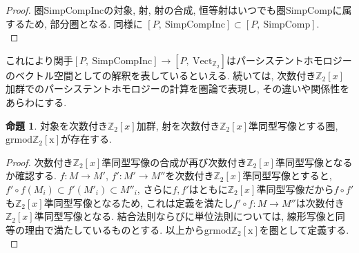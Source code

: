 \documentclass[a4paper]{jsarticle}
\theoremstyle{definition}
\newtheorem{prop}[dfn]{命題}
\newcommand{\SimpComp}{{\mathrm{SimpComp}}}
\newcommand{\Fun}[2]{[#1,~#2]}
\newcommand{\Vect}{{\mathrm{Vect}}}
\newcommand{\SimpCompInc}{{\mathrm{SimpCompInc}}}
\newcommand{\grmodZ}{{\mathrm{grmod \mathbb{Z}_2[x]}}}
\begin{document}
\begin{proof}
     圏SimpCompIncの対象, 射, 射の合成, 恒等射はいつでも圏SimpCompに属するため, 部分圏となる. 同様に $\Fun{P}{\SimpCompInc}\subset \Fun{P}{\SimpComp}$.\\
\end{proof}
 これにより関手$\Fun{P}{\SimpCompInc} \rightarrow \Fun{P}{\Vect_{\mathbb{Z}_2}}$はパーシステントホモロジーのベクトル空間としての解釈を表しているといえる. 続いては, 次数付き$\mathbb{Z}_2[x]$加群でのパーシステントホモロジーの計算を圏論で表現し, その違いや関係性をあらわにする.
\begin{prop}
    対象を次数付き$\mathbb{Z}_2[x]$加群, 射を次数付き$\mathbb{Z}_2[x]$準同型写像とする圏, $\grmodZ$が存在する.
\end{prop}
\begin{proof}
    次数付き$\mathbb{Z}_2[x]$準同型写像の合成が再び次数付き$\mathbb{Z}_2[x]$準同型写像となるか確認する. $f:M\rightarrow M'$, $f':M'\rightarrow M''$を次数付き$\mathbb{Z}_2[x]$準同型写像とすると, $ f'\circ f(M_i)\subset f'(M'_i) \subset M''_i$, さらに$f, f'$はともに$\mathbb{Z}_2[x]$準同型写像だから$f\circ f'$も$\mathbb{Z}_2[x]$準同型写像となるため, これは定義を満たし$f'\circ f:M\rightarrow M''$は次数付き$\mathbb{Z}_2[x]$準同型写像となる. 結合法則ならびに単位法則については, 線形写像と同等の理由で満たしているものとする. 以上から$\grmodZ$を圏として定義する.\\
\end{proof}
\end{document}
